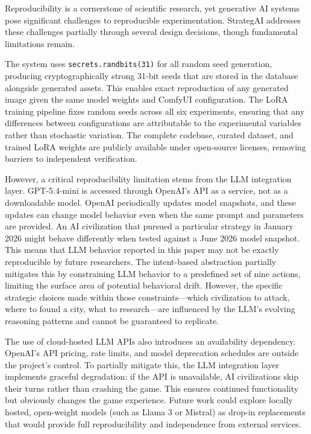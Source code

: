\documentclass[conference]{IEEEtran}
\begin{document}
Reproducibility is a cornerstone of scientific research, yet generative AI systems pose significant challenges to reproducible experimentation. StrategAI addresses these challenges partially through several design decisions, though fundamental limitations remain.

The system uses \texttt{secrets.randbits(31)} for all random seed generation, producing cryptographically strong 31-bit seeds that are stored in the database alongside generated assets. This enables exact reproduction of any generated image given the same model weights and ComfyUI configuration. The LoRA training pipeline fixes random seeds across all six experiments, ensuring that any differences between configurations are attributable to the experimental variables rather than stochastic variation. The complete codebase, curated dataset, and trained LoRA weights are publicly available under open-source licenses, removing barriers to independent verification.

However, a critical reproducibility limitation stems from the LLM integration layer. GPT-5.4-mini is accessed through OpenAI's API as a service, not as a downloadable model. OpenAI periodically updates model snapshots, and these updates can change model behavior even when the same prompt and parameters are provided. An AI civilization that pursued a particular strategy in January 2026 might behave differently when tested against a June 2026 model snapshot. This means that LLM behavior reported in this paper may not be exactly reproducible by future researchers. The intent-based abstraction partially mitigates this by constraining LLM behavior to a predefined set of nine actions, limiting the surface area of potential behavioral drift. However, the specific strategic choices made within those constraints---which civilization to attack, where to found a city, what to research---are influenced by the LLM's evolving reasoning patterns and cannot be guaranteed to replicate.

The use of cloud-hosted LLM APIs also introduces an availability dependency. OpenAI's API pricing, rate limits, and model deprecation schedules are outside the project's control. To partially mitigate this, the LLM integration layer implements graceful degradation: if the API is unavailable, AI civilizations skip their turns rather than crashing the game. This ensures continued functionality but obviously changes the game experience. Future work could explore locally hosted, open-weight models (such as Llama 3 or Mistral) as drop-in replacements that would provide full reproducibility and independence from external services.
\end{document}
